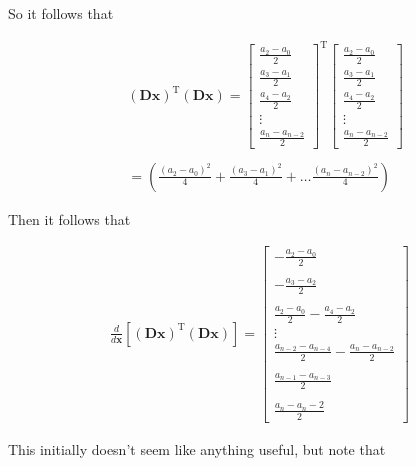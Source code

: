 \documentclass{article}
\newcommand{\x}{\mathbf{x}}
\newcommand{\D}{\mathbf{D}}
\begin{document}
So it follows that

\begin{align*}
  &(\D\x)^{\textrm{T}}(\D\x) = 
  \begin{bmatrix}
  \frac{a_2 - a_0}{2} \\ 
  \frac{a_3 - a_1}{2} \\ 
  \frac{a_4 - a_2}{2} \\
  \vdots \\
  \frac{a_n - a_{n-2}}{2}
  \end{bmatrix} ^ {\textrm{T}}
   \begin{bmatrix}
  \frac{a_2 - a_0}{2} \\ 
  \frac{a_3 - a_1}{2} \\ 
  \frac{a_4 - a_2}{2} \\
  \vdots \\
  \frac{a_n - a_{n-2}}{2}
  \end{bmatrix} \\\\
  &= \left( \frac{(a_2 - a_0)^2}{4} + \frac{(a_3 - a_1)^2}{4} + \dots \frac{(a_n - a_{n-2})^2}{4} \right)
\end{align*}

Then it follows that 

\begin{align*}
\frac{d}{d\x} \left[ (\D\x)^{\textrm{T}}(\D\x) \right] = 
\begin{bmatrix}
- \frac{a_2 - a_0}{2} \\\\
- \frac{a_3 - a_2}{2} \\\\
\frac{a_2 - a_0}{2} - \frac{a_4 - a_2}{2}\\
\vdots \\
\frac{a_{n-2} - a_{n-4}}{2} - \frac{a_n - a_{n-2}}{2}\\\\
\frac{a_{n-1} - a_{n-3}}{2} \\\\
\frac{a_n - a_n-2}{2}
\end{bmatrix}
\end{align*}

This initially doesn't seem like anything useful, but note that
\end{document}
